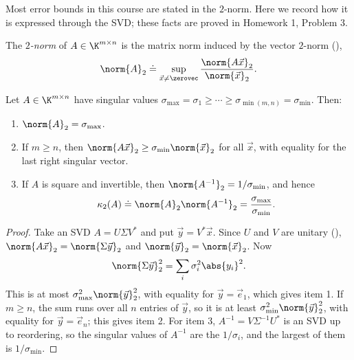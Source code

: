 Most error bounds in this course are stated in the $2$-norm. Here we record how it is expressed through the SVD; these facts are proved in Homework 1, Problem 3.

\begin{definition}
  The \emph{$2$-norm} of $A \in \K^{m \times n}$ is the matrix norm induced by the vector $2$-norm (),
  \begin{equation}
    \norm{A}_2 \doteq \sup_{\vec{x} \ne \zerovec}\frac{\norm{A\vec{x}}_2}{\norm{\vec{x}}_2}.
  \end{equation}
\end{definition}

\begin{theorem}
  \label{thm:twonorm}
  Let $A \in \K^{m \times n}$ have singular values $\sigma_{\max} = \sigma_1 \ge \cdots \ge \sigma_{\min(m,n)} = \sigma_{\min}$. Then:
  \begin{enumerate}
    \item $\norm{A}_2 = \sigma_{\max}$.
    \item If $m \ge n$, then $\norm{A\vec{x}}_2 \ge \sigma_{\min}\norm{\vec{x}}_2$ for all $\vec{x}$, with equality for the last right singular vector.
    \item If $A$ is square and invertible, then $\norm{A^{-1}}_2 = 1/\sigma_{\min}$, and hence
    \begin{equation}
      \kappa_2(A) \doteq \norm{A}_2\norm{A^{-1}}_2 = \frac{\sigma_{\max}}{\sigma_{\min}}.
    \end{equation}
  \end{enumerate}
\end{theorem}

\begin{proof}
  Take an SVD $A = U\Sigma V^\ast$ and put $\vec{y} = V^\ast\vec{x}$. Since $U$ and $V$ are unitary (), $\norm{A\vec{x}}_2 = \norm{\Sigma\vec{y}}_2$ and $\norm{\vec{y}}_2 = \norm{\vec{x}}_2$. Now
  \begin{equation}
    \norm{\Sigma\vec{y}}_2^2 = \sum_{i}\sigma_i^2\abs{y_i}^2.
  \end{equation}
  This is at most $\sigma_{\max}^2\norm{\vec{y}}_2^2$, with equality for $\vec{y} = \vec{e}_1$, which gives item 1. If $m \ge n$, the sum runs over all $n$ entries of $\vec{y}$, so it is at least $\sigma_{\min}^2\norm{\vec{y}}_2^2$, with equality for $\vec{y} = \vec{e}_n$; this gives item 2. For item 3, $A^{-1} = V\Sigma^{-1}U^\ast$ is an SVD up to reordering, so the singular values of $A^{-1}$ are the $1/\sigma_i$, and the largest of them is $1/\sigma_{\min}$.
\end{proof}

